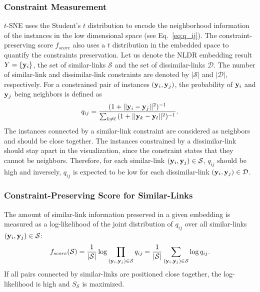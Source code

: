 \subsubsection*{Constraint Measurement}
$t$-SNE uses the Student's $t$ distribution to encode the neighborhood information of the instances in the low dimensional space (see Eq.~\ref{eq:q_ij}).
The constraint-preserving score $f_{score}$ also uses a $t$ distribution in the embedded space to quantify the constraints preservation.
Let us denote the NLDR embedding result ${Y} = \{{{\bf y}_i}\}$, the set of similar-links $\mathcal{S}$ and the set of dissimilar-links $\mathcal{D}$. The number of similar-link and dissimilar-link constraints are denoted by $|\mathcal{S}|$ and $|\mathcal{D}|$, respectively.
For a constrained pair of instances $({\bf y}_i, {\bf y}_j)$, the probability of ${\bf y}_i$ and ${\bf y}_j$ being neighbors is defined as
\begin{equation}\label{equ:q_link}
    q_{ij} = \frac
    { ( 1 + || {\bf y}_i - {\bf y}_j ||^2 )^{-1} }
    { \sum_{k \neq l} { ( 1 + ||{\bf y}_k - {\bf y}_l||^2 )^{-1} } }.
\end{equation}
The instances connected by a similar-link constraint are considered as neighbors and should be close together.
The instances constrained by a dissimilar-link should stay apart in the visualization, since the constraint states that they cannot be neighbors.
Therefore, for each similar-link $({\bf y}_i, {\bf y}_j) \in \mathcal{S}$, $q_{ij}$ should be high and inversely, $q_{ij}$ is expected to be low for each dissimilar-link $({\bf y}_i, {\bf y}_j) \in \mathcal{D}$.

\subsubsection*{Constraint-Preserving Score for Similar-Links}
The amount of similar-link information preserved in a given embedding is measured as a log-likelihood of the joint distribution of $q_{i j}$ over all similar-links $({\bf y}_i, {\bf y}_j) \in \mathcal{S}$:
\begin{equation}
f_{score}(\mathcal{S}) = \frac{1}{|\mathcal{S}|} \log \prod_{({\bf y}_i, {\bf y}_j) \in \mathcal{S}} q_{ij}
                = \frac{1}{|\mathcal{S}|} \sum_{({\bf y}_i, {\bf y}_j) \in \mathcal{S}} \log q_{ij}.
\end{equation}
If all pairs connected by similar-links are positioned close together, the log-likelihood is high and $S_{\mathcal{S}}$ is maximized.


